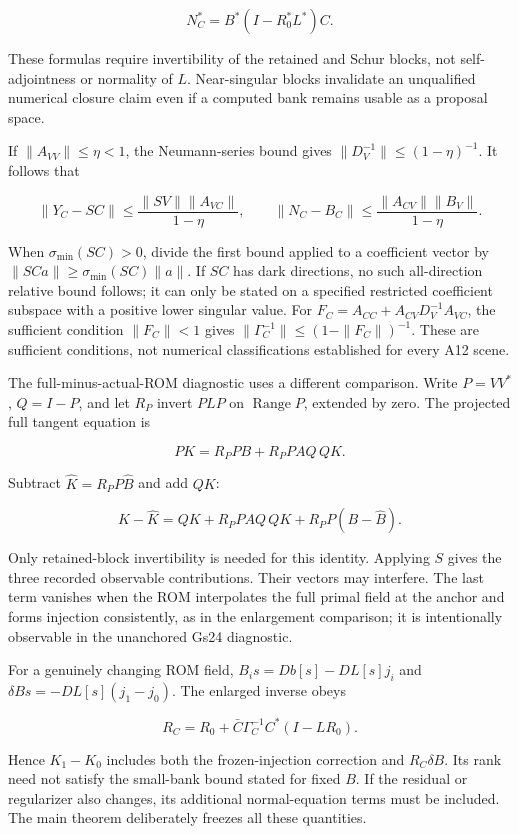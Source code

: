 \documentclass[11pt]{article}
\begin{document}
\[
N_C^*=B^*(I-R_0^*L^*)C. \tag{S6}
\]

These formulas require invertibility of the retained and Schur blocks, not self-adjointness or normality of \(L\). Near-singular blocks invalidate an unqualified numerical closure claim even if a computed bank remains usable as a proposal space.

If \(\|A_{VV}\|\le\eta<1\), the Neumann-series bound gives \(\|D_V^{-1}\|\le(1-\eta)^{-1}\). It follows that

\[
\|Y_C-SC\|\le\frac{\|SV\|\|A_{VC}\|}{1-\eta},\qquad
\|N_C-B_C\|\le\frac{\|A_{CV}\|\|B_V\|}{1-\eta}. \tag{S7}
\]

When \(\sigma_{\min}(SC)>0\), divide the first bound applied to a coefficient vector by \(\|SCa\|\ge\sigma_{\min}(SC)\|a\|\). If \(SC\) has dark directions, no such all-direction relative bound follows; it can only be stated on a specified restricted coefficient subspace with a positive lower singular value. For \(F_C=A_{CC}+A_{CV}D_V^{-1}A_{VC}\), the sufficient condition \(\|F_C\|<1\) gives \(\|\Gamma_C^{-1}\|\le(1-\|F_C\|)^{-1}\). These are sufficient conditions, not numerical classifications established for every A12 scene.

The full-minus-actual-ROM diagnostic uses a different comparison. Write \(P=VV^*\), \(Q=I-P\), and let \(R_P\) invert \(PLP\) on \(\operatorname{Range}P\), extended by zero. The projected full tangent equation is

\[
PK=R_PPB+R_PPAQ\,QK.
\]

Subtract \(\widehat K=R_PP\widehat B\) and add \(QK\):

\[
K-\widehat K=QK+R_PPAQ\,QK+R_PP(B-\widehat B). \tag{S8}
\]

Only retained-block invertibility is needed for this identity. Applying \(S\) gives the three recorded observable contributions. Their vectors may interfere. The last term vanishes when the ROM interpolates the full primal field at the anchor and forms injection consistently, as in the enlargement comparison; it is intentionally observable in the unanchored Gs24 diagnostic.

For a genuinely changing ROM field, \(B_i s=Db[s]-DL[s]j_i\) and \(\delta B s=-DL[s](j_1-j_0)\). The enlarged inverse obeys

\[
R_C=R_0+\bar C\Gamma_C^{-1}C^*(I-LR_0).
\]

Hence \(K_1-K_0\) includes both the frozen-injection correction and \(R_C\delta B\). Its rank need not satisfy the small-bank bound stated for fixed \(B\). If the residual or regularizer also changes, its additional normal-equation terms must be included. The main theorem deliberately freezes all these quantities.
\end{document}
